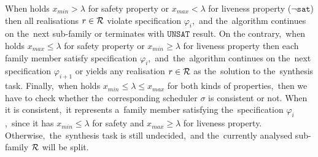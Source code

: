 When holds $x_{min} > \lambda$ for safety property or $x_{max} < \lambda$ for liveness property ($\neg \mathtt{sat}$) then all realisations $r \in \mathcal{R}$ violate specification $\varphi_{i}$,~and the~algorithm continues on the~next sub-family or terminates with $\mathtt{UNSAT}$ result.
On the contrary,~when holds $x_{max} \leq \lambda$ for safety property or $x_{min} \geq \lambda$ for liveness property then each family member satisfy specification $\varphi_{i}$,~and~the~algorithm continues on the~next specification $\varphi_{i+1}$ or yields any realisation $r \in \mathcal{R}$ as the~solution to the~synthesis task.
Finally,~when holds $x_{min} \leq \lambda \leq x_{max}$ for both kinds of properties,~then we have to check whether the~corresponding scheduler $\sigma$ is consistent or not.
When it is consistent,~it represents a~family member satisfying the~specification $\varphi_{i}$,~since it has $x_{min} \leq \lambda$ for safety and $x_{max} \geq \lambda$ for liveness property.
Otherwise,~the~synthesis task is still undecided,~and the~currently analysed sub-family $\mathcal{R}$ will be split.

